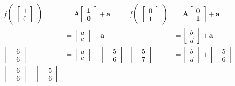 \documentclass{article}
\begin{document}
\begin{align*}
    f\begin{pmatrix} \begin{bmatrix} 1 \\ 0\end{bmatrix} \end{pmatrix}
        &= \mathbf{A\begin{bmatrix} 1 \\ 0\end{bmatrix} + a} &
    f\begin{pmatrix} \begin{bmatrix} 0 \\ 1\end{bmatrix} \end{pmatrix}
        &= \mathbf{A\begin{bmatrix} 0 \\ 1\end{bmatrix} + a} \\
        &= \begin{bmatrix} a \\ c\end{bmatrix} + \mathbf a &
        &= \begin{bmatrix} b \\ d\end{bmatrix} + \mathbf a \\
    \begin{bmatrix} -6 \\ -6\end{bmatrix}
        &= \begin{bmatrix} a \\ c\end{bmatrix} + \begin{bmatrix} -5 \\ -6\end{bmatrix} &
    \begin{bmatrix} -5 \\ -7\end{bmatrix}
        &= \begin{bmatrix} b \\ d\end{bmatrix} + \begin{bmatrix} -5 \\ -6\end{bmatrix} \\
    \begin{bmatrix} -6 \\ -6\end{bmatrix} - \begin{bmatrix} -5 \\ -6\end{bmatrix}

\end{align*}
\end{document}
